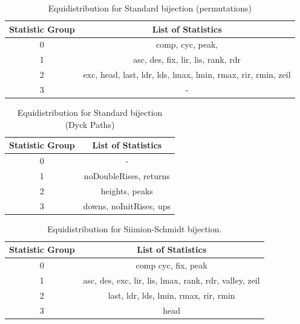 \documentclass[12pt]{article}
\begin{document}
\begin{table}[H]
\caption{Equidistribution for Standard bijection (permutations)}
\centering
\begin{tabular}{c | c}
\hline\hline
Statistic Group & List of Statistics \\ [0.5ex]
\hline
0 & {comp, cyc, peak, } \\
1 & {asc, des, fix, lir, lis, rank, rdr} \\
2 & {exc, head, last, ldr, lds, lmax, lmin, rmax, rir, rmin, zeil} \\
3 & {-} \\
\hline
\end{tabular}
\label{table:EDStandardPerms}
\end{table}

\begin{table}[H]
\caption{Equidistribution for Standard bijection (Dyck Paths)}
\centering
\begin{tabular}{c | c}
\hline\hline
Statistic Group & List of Statistics \\ [0.5ex]
\hline
0 & {-} \\
1 & {noDoubleRises, returns} \\
2 & {heights, peaks} \\
3 & {downs, noInitRises, ups} \\
\hline
\end{tabular}
\label{table:EDStandardDP}
\end{table}
\newpage

\begin{table}[H]
\caption{Equidistribution for Siimion-Schmidt bijection.}
\centering
\begin{tabular}{c | c}
\hline\hline
Statistic Group & List of Statistics \\ [0.5ex]
\hline
0 & {comp cyc, fix, peak} \\
1 & {asc, des, exc, lir, lis, lmax, rank, rdr, valley, zeil} \\
2 & {last, ldr, lds, lmin, rmax, rir, rmin} \\
3 & {head} 
\hline
\end{tabular}
\label{table:EDSSPerms}
\end{table}
\newpage
\end{document}
